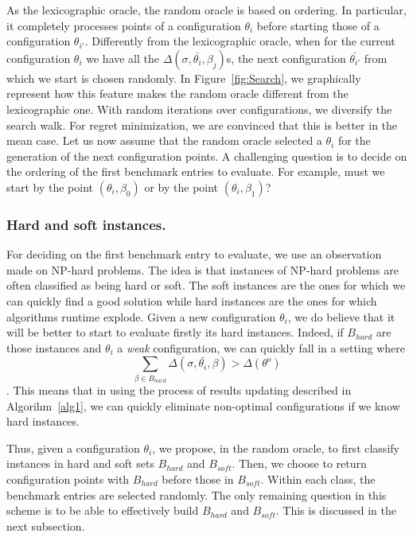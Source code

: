 \documentclass[10pt, conference, compsocconf]{IEEEtran}
\begin{document}
As the lexicographic oracle, the random oracle is based on
ordering. In particular, it completely processes points of a
configuration $\theta_{i}$ before starting those of a configuration
$\theta_{i'}$.  Differently from the lexicographic oracle, when for
the current configuration $\theta_i$ we have all the
$\Delta(\sigma, \bar{\theta_i}, \beta_j)$s, the next configuration
$\bar{\theta_{i'}}$ from which we start is chosen randomly. In
Figure~\ref{fig:Search}, we graphically represent how this feature
makes the random oracle different from the lexicographic one. With
random iterations over configurations, we diversify the search
walk. For regret minimization, we are convinced that this is better in
the mean case.  Let us now assume that the random oracle selected a
$\theta_i$ for the generation of the next configuration points. A
challenging question is to decide on the ordering of the first
benchmark entries to evaluate.  For example, must we start by the
point $(\theta_i, \beta_0)$ or by the point $(\theta_i, \beta_1)$?

\subsubsection{Hard and soft instances.} 

For deciding on the first benchmark entry to evaluate, we use an
observation made on NP-hard problems.  The idea is that instances of
NP-hard problems are often classified as being hard or soft. The soft
instances are the ones for which we can quickly find a good solution
while hard instances are the ones for which algorithms runtime
explode.  Given a new configuration $\theta_i$, we do believe that it
will be better to start to evaluate firstly its hard
instances. Indeed, if $B_{hard}$ are those instances and $\theta_i$ a
{\it weak} configuration, we can quickly fall in a setting where
\[ \sum_{\beta \in B_{hard}} \Delta(\sigma, \bar{\theta_i}, \beta) >
\Delta(\theta^o)\].
This means that in using the process of results updating described in
Algorihm~\ref{alg1}, we can quickly eliminate non-optimal
configurations if we know hard instances.

Thus, given a configuration $\theta_i$, we propose, in the random
oracle, to first classify instances in hard and soft sets $B_{hard}$
and $B_{soft}$. Then, we choose to return configuration points with
$B_{hard}$ before those in $B_{soft}$. Within each class, the
benchmark entries are selected randomly.  The only remaining question
in this scheme is to be able to effectively build $B_{hard}$ and
$B_{soft}$.  This is discussed in the next subsection.
\end{document}
